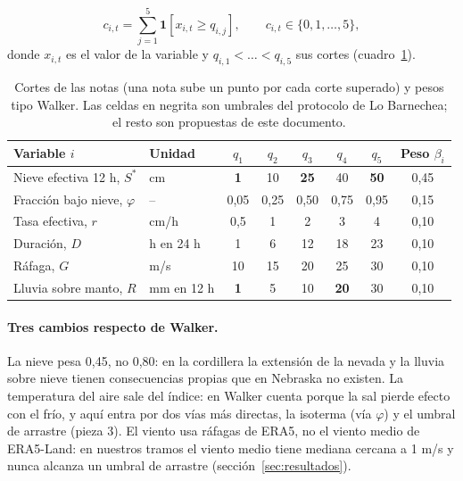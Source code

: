 
\begin{equation}
c_{i,t} = \sum_{j=1}^{5} \mathbf{1}\!\left[x_{i,t} \ge q_{i,j}\right], \qquad c_{i,t} \in \{0,1,\dots,5\},
\end{equation}
donde $x_{i,t}$ es el valor de la variable y $q_{i,1} < \dots < q_{i,5}$ sus cortes (cuadro~\ref{tab:cortes}).

\begin{table}[ht]
\centering\small
\caption{Cortes de las notas (una nota sube un punto por cada corte superado) y pesos tipo Walker. Las celdas en negrita son umbrales del protocolo de Lo Barnechea; el resto son propuestas de este documento.}
\label{tab:cortes}
\begin{tabular}{|l|l|c|c|c|c|c|c|}
\hline
Variable $i$ & Unidad & $q_1$ & $q_2$ & $q_3$ & $q_4$ & $q_5$ & Peso $\beta_i$ \\ \hline
Nieve efectiva 12 h, $S^*$ & cm & \textbf{1} & 10 & \textbf{25} & 40 & \textbf{50} & 0,45 \\ \hline
Fracción bajo nieve, $\varphi$ & -- & 0,05 & 0,25 & 0,50 & 0,75 & 0,95 & 0,15 \\ \hline
Tasa efectiva, $r$ & cm/h & 0,5 & 1 & 2 & 3 & 4 & 0,10 \\ \hline
Duración, $D$ & h en 24 h & 1 & 6 & 12 & 18 & 23 & 0,10 \\ \hline
Ráfaga, $G$ & m/s & 10 & 15 & 20 & 25 & 30 & 0,10 \\ \hline
Lluvia sobre manto, $R$ & mm en 12 h & \textbf{1} & 5 & 10 & \textbf{20} & 30 & 0,10 \\ \hline
\end{tabular}
\end{table}

\paragraph{Tres cambios respecto de Walker.} La nieve pesa 0,45, no 0,80: en la cordillera la extensión de la nevada y la lluvia sobre nieve tienen consecuencias propias que en Nebraska no existen. La temperatura del aire sale del índice: en Walker cuenta porque la sal pierde efecto con el frío, y aquí entra por dos vías más directas, la isoterma (vía $\varphi$) y el umbral de arrastre (pieza 3). El viento usa ráfagas de ERA5, no el viento medio de ERA5-Land: en nuestros tramos el viento medio tiene mediana cercana a 1 m/s y nunca alcanza un umbral de arrastre (sección~\ref{sec:resultados}).

